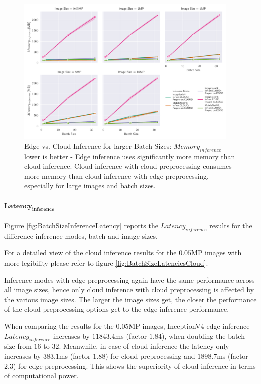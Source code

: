 \begin{figure}[!htb]
\centering
\includegraphics[width=0.95\textwidth]{./Bilder/single_plots/batch_size_plots/Effects_of_Batch_size_Inference_Memory.pdf}
\caption[Edge vs. Cloud Inference for larger Batch Sizes:  $Memory_{inference}$ - lower is better]{Edge vs. Cloud Inference for larger Batch Sizes:  $Memory_{inference}$ - lower is better - Edge inference uses significantly more memory than cloud inference. Cloud inference with cloud preprocessing consumes more memory than cloud inference with edge preprocessing, especially for large images and batch sizes.}
\label{fig:BatchSizeInferenceMemory}
\end{figure}


\paragraph{$\mathbf{Latency_{inference}}$}
Figure \ref{fig:BatchSizeInferenceLatency} reports the $Latency_{inference}$ results for the difference inference modes, batch and image sizes.

For a detailed view of the cloud inference results for the $0.05$MP images with more legibility please refer to figure \ref{fig:BatchSizeLatenciesCloud}.

Inference modes with edge preprocessing again have the same performance across all image sizes, hence only cloud inference with cloud preprocessing is affected by the various image sizes.
The larger the image sizes get, the closer the performance of the cloud preprocessing options get to the edge inference performance.

When comparing the results for the $0.05$MP images, InceptionV4 edge inference $Latency_{inference}$ increases by $11843.4$ms (factor $1.84$), when doubling the batch size from $16$ to $32$.
Meanwhile, in case of cloud inference the latency only increases by $383.1$ms (factor $1.88$) for cloud preprocessing and $1898.7$ms (factor $2.3$) for edge preprocessing.
This shows the superiority of cloud inference in terms of computational power.


